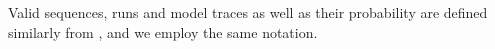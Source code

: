 %
Valid sequences, runs and model traces as well as their probability are defined similarly from , and we employ the same notation.




